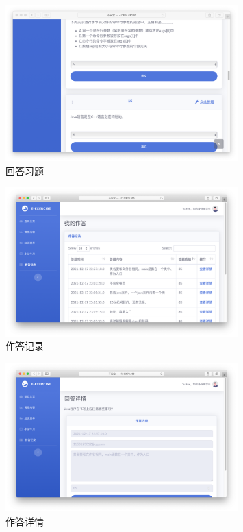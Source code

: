 \documentclass{nwafucoursepaper}
\begin{document}
\begin{figure}[htp]
  \centering
  \includegraphics[width=0.8\textwidth]{answer_exercise.png}
  \caption{回答习题}
  \label{answer_exercise}
\end{figure}

\begin{figure}[htp]
  \centering
  \includegraphics[width=0.8\textwidth]{answer_record.png}
  \caption{作答记录}
  \label{answer_record}
\end{figure}

\begin{figure}[htp]
  \centering
  \includegraphics[width=0.8\textwidth]{answer_detail.png}
  \caption{作答详情}
  \label{answer_detail}
\end{figure}
\end{document}

